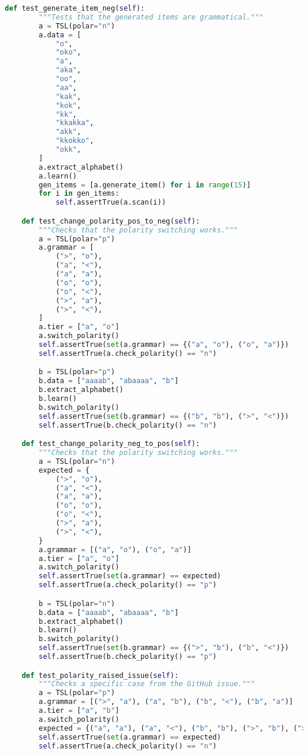 \begin{lstlisting}[language=Python]
    def test_generate_item_neg(self):
        """Tests that the generated items are grammatical."""
        a = TSL(polar="n")
        a.data = [
            "o",
            "oko",
            "a",
            "aka",
            "oo",
            "aa",
            "kak",
            "kok",
            "kk",
            "kkakka",
            "akk",
            "kkokko",
            "okk",
        ]
        a.extract_alphabet()
        a.learn()
        gen_items = [a.generate_item() for i in range(15)]
        for i in gen_items:
            self.assertTrue(a.scan(i))

    def test_change_polarity_pos_to_neg(self):
        """Checks that the polarity switching works."""
        a = TSL(polar="p")
        a.grammar = [
            (">", "o"),
            ("a", "<"),
            ("a", "a"),
            ("o", "o"),
            ("o", "<"),
            (">", "a"),
            (">", "<"),
        ]
        a.tier = ["a", "o"]
        a.switch_polarity()
        self.assertTrue(set(a.grammar) == {("a", "o"), ("o", "a")})
        self.assertTrue(a.check_polarity() == "n")

        b = TSL(polar="p")
        b.data = ["aaaab", "abaaaa", "b"]
        b.extract_alphabet()
        b.learn()
        b.switch_polarity()
        self.assertTrue(set(b.grammar) == {("b", "b"), (">", "<")})
        self.assertTrue(b.check_polarity() == "n")

    def test_change_polarity_neg_to_pos(self):
        """Checks that the polarity switching works."""
        a = TSL(polar="n")
        expected = {
            (">", "o"),
            ("a", "<"),
            ("a", "a"),
            ("o", "o"),
            ("o", "<"),
            (">", "a"),
            (">", "<"),
        }
        a.grammar = [("a", "o"), ("o", "a")]
        a.tier = ["a", "o"]
        a.switch_polarity()
        self.assertTrue(set(a.grammar) == expected)
        self.assertTrue(a.check_polarity() == "p")

        b = TSL(polar="n")
        b.data = ["aaaab", "abaaaa", "b"]
        b.extract_alphabet()
        b.learn()
        b.switch_polarity()
        self.assertTrue(set(b.grammar) == {(">", "b"), ("b", "<")})
        self.assertTrue(b.check_polarity() == "p")

    def test_polarity_raised_issue(self):
        """Checks a specific case from the GitHub issue."""
        a = TSL(polar="p")
        a.grammar = [(">", "a"), ("a", "b"), ("b", "<"), ("b", "a")]
        a.tier = ["a", "b"]
        a.switch_polarity()
        expected = {("a", "a"), ("a", "<"), ("b", "b"), (">", "b"), (">", "<")}
        self.assertTrue(set(a.grammar) == expected)
        self.assertTrue(a.check_polarity() == "n")


\end{lstlisting}
